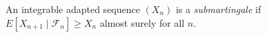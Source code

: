 
An integrable adapted sequence $(X_n)$ is a \emph{submartingale} if $E[X_{n+1}\mid\mathcal F_n]\ge X_n$ almost surely for all $n$.
